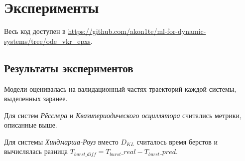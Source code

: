 \documentclass[PMI,VKR]{HSEUniversity}
\begin{document}
\chapter{Эксперименты}

Весь код доступен в \url{https://github.com/akon1te/ml-for-dynamic-systems/tree/ode_vkr_epxs}.

\section{Результаты экспериментов}

Модели оценивалась на валидационный частях траекторий каждой системы, выделенных заранее. 

Для систем \emph{Рёсслера} и \emph{Квазипериодического осциллятора} считались метрики, описанные выше. 

Для системы \emph{Хиндмарша-Роуз} вместо $D_{KL}$ считалось время берстов и вычислялась разница $T_{burst\_diff} = T_{burst}\_real - T_{burst}\_pred$. 
\end{document}
